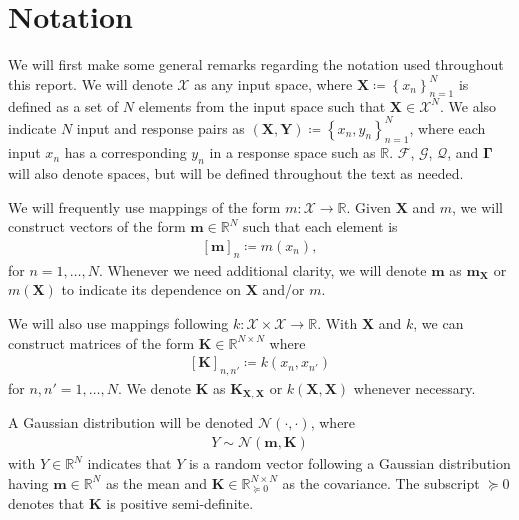 \documentclass{article}
\numberwithin{equation}{section}
\begin{document}
\newpage
\section{Notation}
We will first make some general remarks regarding the notation used throughout this report. 
We will denote $\mathcal{X}$ as any input space, where $\mathbf{X} \coloneqq \left\{x_n\right\}_{n=1}^N$ is defined as a set of $N$ elements from the input space such that $\mathbf{X} \in \mathcal{X}^N$.
We also indicate $N$ input and response pairs as $\left(\mathbf{X}, \mathbf{Y}\right) \coloneqq \left\{x_n, y_n\right\}_{n=1}^N$, where each input $x_n$ has a corresponding $y_n$ in a response space such as $\mathbb{R}$.
$\boldsymbol{\boldsymbol{\mathcal{F}}}$, $\boldsymbol{\mathcal{G}}$, $\boldsymbol{\mathcal{Q}}$, and $\boldsymbol{\Gamma}$ will also denote spaces, but will be defined throughout the text as needed.

We will frequently use mappings of the form $m: \mathcal{X} \rightarrow \mathbb{R}$. 
Given $\mathbf{X}$ and $m$, we will construct vectors of the form $\mathbf{m} \in \mathbb{R}^N$ such that each element is
\begin{align}
    \left[\mathbf{m}\right]_{n} \coloneqq m(x_n),
\end{align}
for $n=1,\dots, N$. Whenever we need additional clarity, we will denote $\mathbf{m}$ as $\mathbf{m}_{\mathbf{X}}$ or $m\left(\mathbf{X}\right)$ to indicate its dependence on $\mathbf{X}$ and/or $m$.

We will also use mappings following $k: \mathcal{X} \times \mathcal{X} \rightarrow \mathbb{R}$.
With $\mathbf{X}$ and $k$, we can construct matrices of the form $\mathbf{K} \in \mathbb{R}^{N\times N}$ where
\begin{align}
    \left[\mathbf{K}\right]_{n, n'} \coloneqq k(x_n, x_{n'})
\end{align}
for $n, n'=1,\dots,N$. 
We denote $\mathbf{K}$ as $\mathbf{K}_{\mathbf{X}, \mathbf{X}}$ or $k\left(\mathbf{X}, \mathbf{X}\right)$ whenever necessary.

A Gaussian distribution will be denoted $\mathcal{N}(\cdot, \cdot)$, where 
\begin{align}
    Y \sim \mathcal{N}(\mathbf{m}, \mathbf{K})
\end{align}
with $Y \in \mathbb{R}^N$ indicates that $Y$ is a random vector following a Gaussian distribution having $\mathbf{m} \in \mathbb{R}^N$ as the mean and $\mathbf{K} \in \mathbb{R}^{N \times N}_{\succcurlyeq 0}$ as the covariance. 
The subscript ${\succcurlyeq 0}$ denotes that $\mathbf{K}$ is positive semi-definite.
\end{document}
